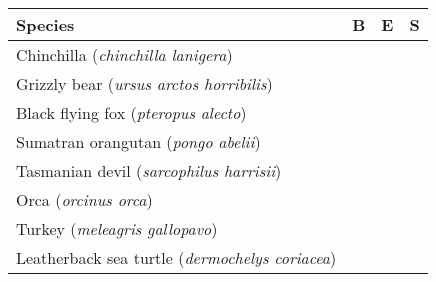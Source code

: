 \newcommand{\prediction}[5]{#1 (\emph{#2}) & #3 & #4 & #5 }

\begin{table}[h!]
    \centering
    \begin{tabular}{lccc}
        \hline
        \textbf{Species} & \textbf{B} & \textbf{E} & \textbf{S} \\
        \hline
        \prediction{Chinchilla}{chinchilla lanigera}{\texttimes}{}{} \\
        \prediction{Grizzly bear}{ursus arctos horribilis}{\texttimes}{\texttimes}{\texttimes} \\
        \prediction{Black flying fox}{pteropus alecto}{}{\texttimes}{\texttimes} \\
        \prediction{Sumatran orangutan}{pongo abelii}{\texttimes}{\texttimes}{\texttimes} \\
        \prediction{Tasmanian devil}{sarcophilus harrisii}{}{}{} \\
        \prediction{Orca}{orcinus orca}{\texttimes}{\texttimes}{\texttimes} \\
        \prediction{Turkey}{meleagris gallopavo}{}{}{} \\
        \prediction{Leatherback sea turtle}{dermochelys coriacea}{}{}{} \\
        \hline
    \end{tabular}
\end{table}